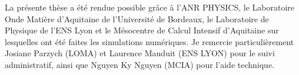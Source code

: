 La présente thèse a été rendue possible grâce à l'ANR PHYSICS, le Laboratoire Onde Matière d'Aquitaine de l'Université de Bordeaux, le Laboratoire de Physique de l'ENS Lyon et le Mésocentre de Calcul Intensif d'Aquitaine sur lesquelles ont été faites les simulations numériques. Je remercie particulièrement Josiane Parzych (LOMA) et Laurence Mauduit (ENS LYON) pour le suivi administratif, ainsi que Nguyen Ky Nguyen (MCIA) pour l'aide technique.
